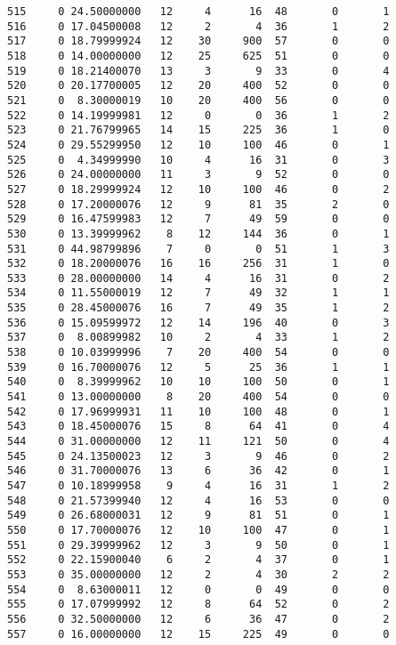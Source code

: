 \documentclass[
  letterpaper,
  DIV=11,
  numbers=noendperiod]{scrreprt}
\begin{document}
\begin{verbatim}
515     0 24.50000000   12     4      16  48       0       1
516     0 17.04500008   12     2       4  36       1       2
517     0 18.79999924   12    30     900  57       0       0
518     0 14.00000000   12    25     625  51       0       0
519     0 18.21400070   13     3       9  33       0       4
520     0 20.17700005   12    20     400  52       0       0
521     0  8.30000019   10    20     400  56       0       0
522     0 14.19999981   12     0       0  36       1       2
523     0 21.76799965   14    15     225  36       1       0
524     0 29.55299950   12    10     100  46       0       1
525     0  4.34999990   10     4      16  31       0       3
526     0 24.00000000   11     3       9  52       0       0
527     0 18.29999924   12    10     100  46       0       2
528     0 17.20000076   12     9      81  35       2       0
529     0 16.47599983   12     7      49  59       0       0
530     0 13.39999962    8    12     144  36       0       1
531     0 44.98799896    7     0       0  51       1       3
532     0 18.20000076   16    16     256  31       1       0
533     0 28.00000000   14     4      16  31       0       2
534     0 11.55000019   12     7      49  32       1       1
535     0 28.45000076   16     7      49  35       1       2
536     0 15.09599972   12    14     196  40       0       3
537     0  8.00899982   10     2       4  33       1       2
538     0 10.03999996    7    20     400  54       0       0
539     0 16.70000076   12     5      25  36       1       1
540     0  8.39999962   10    10     100  50       0       1
541     0 13.00000000    8    20     400  54       0       0
542     0 17.96999931   11    10     100  48       0       1
543     0 18.45000076   15     8      64  41       0       4
544     0 31.00000000   12    11     121  50       0       4
545     0 24.13500023   12     3       9  46       0       2
546     0 31.70000076   13     6      36  42       0       1
547     0 10.18999958    9     4      16  31       1       2
548     0 21.57399940   12     4      16  53       0       0
549     0 26.68000031   12     9      81  51       0       1
550     0 17.70000076   12    10     100  47       0       1
551     0 29.39999962   12     3       9  50       0       1
552     0 22.15900040    6     2       4  37       0       1
553     0 35.00000000   12     2       4  30       2       2
554     0  8.63000011   12     0       0  49       0       0
555     0 17.07999992   12     8      64  52       0       2
556     0 32.50000000   12     6      36  47       0       2
557     0 16.00000000   12    15     225  49       0       0

\end{verbatim}
\end{document}
